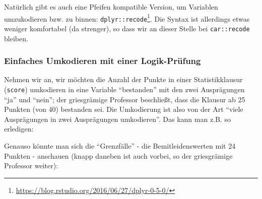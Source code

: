 \documentclass[12pt,ngerman,]{book}
\makeatletter
\newenvironment{Shaded}{\begin{snugshade}}{\end{snugshade}}
\newcommand{\KeywordTok}[1]{\textcolor[rgb]{0.13,0.29,0.53}{\textbf{#1}}}
\newcommand{\DecValTok}[1]{\textcolor[rgb]{0.00,0.00,0.81}{#1}}
\newcommand{\StringTok}[1]{\textcolor[rgb]{0.31,0.60,0.02}{#1}}
\newcommand{\CommentTok}[1]{\textcolor[rgb]{0.56,0.35,0.01}{\textit{#1}}}
\newcommand{\OperatorTok}[1]{\textcolor[rgb]{0.81,0.36,0.00}{\textbf{#1}}}
\newcommand{\NormalTok}[1]{#1}
\let\rmarkdownfootnote\footnote%
\def\footnote{\protect\rmarkdownfootnote}
\newenvironment{kframe}{%
\medskip{}
\setlength{\fboxsep}{.8em}
 \def\at@end@of@kframe{}%
 \ifinner\ifhmode%
  \def\at@end@of@kframe{\end{minipage}}%
  \begin{minipage}{\columnwidth}%
 \fi\fi%
 \def\FrameCommand##1{\hskip\@totalleftmargin \hskip-\fboxsep
 \colorbox{shadecolor}{##1}\hskip-\fboxsep
     \hskip-\linewidth \hskip-\@totalleftmargin \hskip\columnwidth}%
 \MakeFramed {\advance\hsize-\width
   \@totalleftmargin\z@ \linewidth\hsize
   \@setminipage}}%
 {\par\unskip\endMakeFramed%
 \at@end@of@kframe}
\renewenvironment{Shaded}{\begin{kframe}}{\end{kframe}}
\theoremstyle{definition}
\theoremstyle{definition}
\theoremstyle{remark}
\makeatother
\begin{document}
Natürlich gibt es auch eine Pfeifen kompatible Version, um Variablen
umzukodieren bzw. zu binnen: \texttt{dplyr::recode}\footnote{\url{https://blog.rstudio.org/2016/06/27/dplyr-0-5-0/}}.
Die Syntax ist allerdings etwas weniger komfortabel (da strenger), so
dass wir an dieser Stelle bei \texttt{car::recode} bleiben.

\subsubsection{Einfaches Umkodieren mit einer
Logik-Prüfung}\label{einfaches-umkodieren-mit-einer-logik-prufung}

Nehmen wir an, wir möchten die Anzahl der Punkte in einer
Statistikklausur (\texttt{score}) umkodieren in eine Variable
``bestanden'' mit den zwei Ausprägungen ``ja'' und ``nein''; der
griesgrämige Professor beschließt, dass die Klausur ab 25 Punkten (von
40) bestanden sei. Die Umkodierung ist also von der Art ``viele
Ausprägungen in zwei Ausprägungen umkodieren''. Das kann man z.B. so
erledigen:

\begin{Shaded}
\end{Shaded}

Genauso könnte man sich die ``Grenzfälle'' - die Bemitleidenswerten mit
24 Punkten - anschauen (knapp daneben ist auch vorbei, so der
griesgrämige Professor weiter):

\begin{Shaded}
\end{Shaded}
\end{document}
